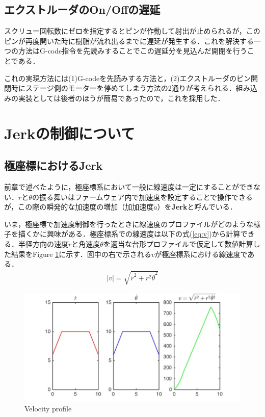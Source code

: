 \documentclass[twocolumn,oneside,a4paper]{article}
\begin{document}
\subsection{エクストルーダのOn/Offの遅延}
スクリュー回転数にゼロを指定するとピンが作動して射出が止められるが，このピンが再度開いた時に樹脂が流れ出るまでに遅延が発生する．これを解決する一つの方法はG-code指令を先読みすることでこの遅延分を見込んだ開閉を行うことである．

これの実現方法には(1)G-codeを先読みする方法と，(2)エクストルーダのピン開閉時にステージ側のモーターを停めてしまう方法の2通りが考えられる．組み込みの実装としては後者のほうが簡易であったので，これを採用した．

\section{Jerkの制御について}
\subsection{極座標におけるJerk}
前章で述べたように，極座標系において一般に線速度は一定にすることができない．$\dot{r}$と$\dot{\theta}$の振る舞いはファームウェア内で加速度を設定することで操作できるが，この際の瞬発的な加速度の増加（加加速度$\dot{a}$）を{\bf Jerk}と呼んでいる．

いま，極座標で加速度制御を行ったときに線速度のプロファイルがどのような様子を描くかに興味がある．極座標系での線速度は以下の式(\ref{eq:v})から計算できる．半径方向の速度$\dot{r}$と角速度$\dot{\theta}$を適当な台形プロファイルで仮定して数値計算した結果をFigure \ref{fig:jerk}に示す．図中の右で示される$v$が極座標系における線速度である．
\begin{eqnarray}\label{eq:v}
     |v| = \sqrt{ \dot{r}^2+ r^2 \dot{\theta}^2 }
\end{eqnarray}

\begin{figure}[htbp]
    \includegraphics[bb=0 0 432 216,width=1\columnwidth]{accel2.pdf}
    \caption{Velocity profile}
    \label{fig:jerk}
\end{figure}
\end{document}
